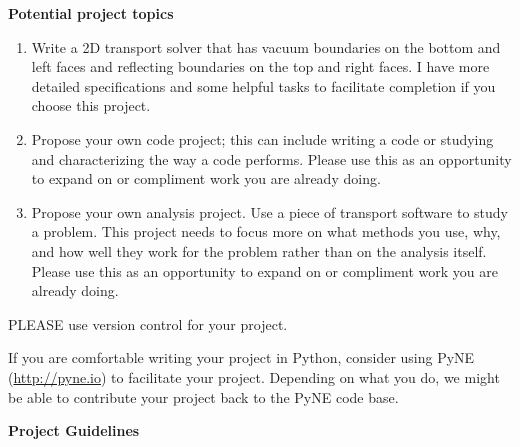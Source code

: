 \documentclass[12pt]{article}
\begin{document}
\clearpage 
\begin{center}
\textbf{Potential project topics}
\end{center}

\begin{enumerate}
\item Write a 2D transport solver that has vacuum boundaries on the bottom and left faces and reflecting boundaries on the top and right faces. I have more detailed specifications and some helpful tasks to facilitate completion if you choose this project.


\item Propose your own code project; this can include writing a code or studying and characterizing the way a code performs. Please use this as an opportunity to expand on or compliment work you are already doing.

\item  Propose your own analysis project. Use a piece of transport software to study a problem. This project needs to focus more on what methods you use, why, and how well they work for the problem rather than on the analysis itself. Please use this as an opportunity to expand on or compliment work you are already doing.
\end{enumerate}

\vspace*{1 em}
PLEASE use version control for your project. 

\vspace*{1 em}
\noindent If you are comfortable writing your project in Python, consider using PyNE (\href{http://pyne.io}{http://pyne.io}) to facilitate your project. Depending on what you do, we might be able to contribute your project back to the PyNE code base.

\clearpage 
\begin{center}
\textbf{Project Guidelines}
\end{center}
\end{document}

